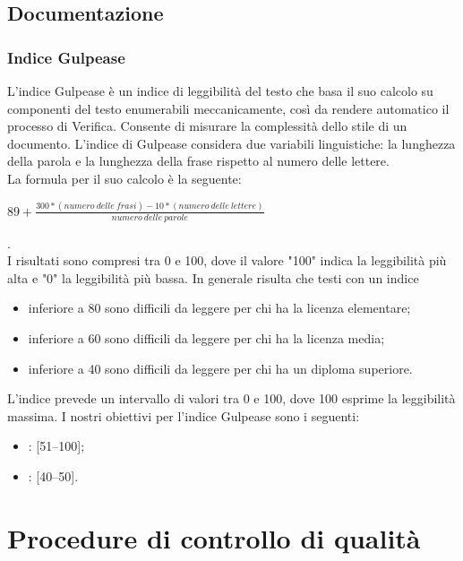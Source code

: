 \subsection{Documentazione}

\subsubsection{Indice Gulpease}
L'indice Gulpease è un indice di leggibilità del testo che basa il suo calcolo su componenti del testo enumerabili meccanicamente, così da rendere automatico il processo di Verifica. Consente di misurare la complessità dello stile di un documento.
L'indice di Gulpease considera due variabili linguistiche: la lunghezza della parola e la lunghezza della frase rispetto al numero delle lettere.\\
La formula per il suo calcolo è la seguente:
\\
\begin{center}
\begin{math}
89+\frac{300*(numero\:delle\:frasi)-10*(numero\:delle\:lettere)}{numero\:delle\:parole}
\end{math}
\end{center}
.\\
I risultati sono compresi tra 0 e 100, dove il valore "100" indica la leggibilità più alta e "0" la leggibilità più bassa. In generale risulta che testi con un indice
\begin{itemize}
\item inferiore a 80 sono difficili da leggere per chi ha la licenza elementare;
\item inferiore a 60 sono difficili da leggere per chi ha la licenza media;
\item inferiore a 40 sono difficili da leggere per chi ha un diploma superiore.
\end{itemize}
L'indice prevede un intervallo di valori tra 0 e 100, dove 100 esprime la leggibilità massima.
I nostri obiettivi per l'indice Gulpease sono i seguenti:
\begin{itemize}
\item {}: [51--100];
\item {}: [40--50].
\end{itemize}

\newpage

\section{Procedure di controllo di qualità}

